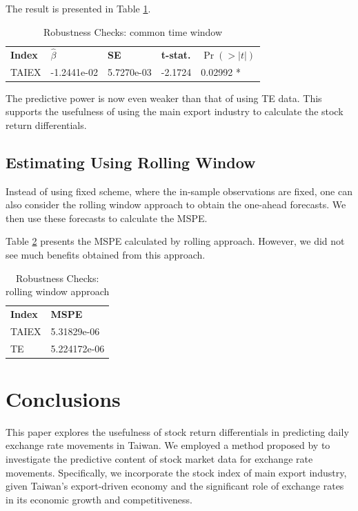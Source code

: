 \documentclass[]{AEA}
\begin{document}
\begin{spacing}{2.0}
The result is presented in Table \ref{t8}.

\begin{table}
\caption{Robustness Checks: common time window}
\label{t8}
\begin{tabular}{lllll}
\textbf{Index} & \textbf{$\hat \beta$} & \textbf{SE} & \textbf{t-stat.} & \textbf{$\Pr(>|t|)$} \\
TAIEX & -1.2441e-02 & 5.7270e-03 & -2.1724 & 0.02992 *
\end{tabular}
\end{table}

The predictive power is now even weaker than that of using TE data. This supports the usefulness of using the main export industry to calculate the stock return differentials.

\subsection{Estimating Using Rolling Window}

Instead of using fixed scheme, where the in-sample observations are fixed, one can also consider the rolling window approach to obtain the one-ahead forecasts. We then use these forecasts to calculate the MSPE.

Table \ref{t9} presents the MSPE calculated by rolling approach. However, we did not see much benefits obtained from this approach.

\begin{table}
\caption{Robustness Checks: rolling window approach}
\label{t9}
\begin{tabular}{ll}
\textbf{Index} & \textbf{MSPE}\\
TAIEX & 5.31829e-06 \\
TE & 5.224172e-06
\end{tabular}
\end{table}

\section{Conclusions}

This paper explores the usefulness of stock return differentials in predicting daily exchange rate movements in Taiwan. We employed a method proposed by \cite{chen2019stock} to investigate the predictive content of stock market data for exchange rate movements. Specifically, we incorporate the stock index of main export industry, given Taiwan's export-driven economy and the significant role of exchange rates in its economic growth and competitiveness.


\end{spacing}
\end{document}

